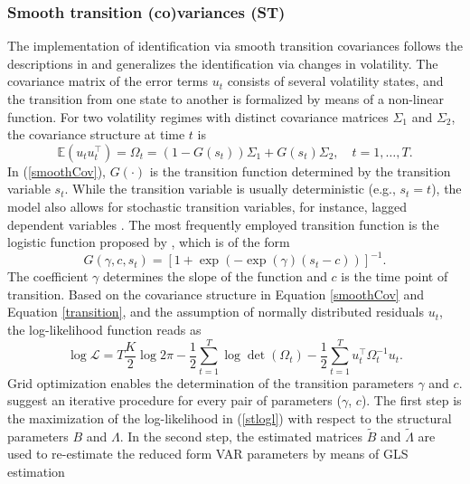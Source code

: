 \documentclass[nojss]{jss}\usepackage[]{graphicx}\usepackage[]{color}
\begin{document}
\subsubsection{Smooth transition (co)variances (ST)}\label{sec:smoothtransition}
The implementation of identification via smooth transition covariances follows the descriptions in \cite{LUTKEPOHL201743} and generalizes the identification via changes in volatility. The covariance matrix of the error terms $u_t$ consists of several volatility states, and the transition from one state to another is formalized by means of a non-linear function. For two volatility regimes with distinct covariance matrices $\Sigma_1$ and $\Sigma_2$, the covariance structure at time $t$ is
\begin{equation}\label{smoothCov}
\mathbb{E}(u_tu_t^\top) = \Omega_t = \left(1 - G(s_t)\right)\Sigma_1 + G(s_t)\Sigma_2,\quad t=1,\ldots,T.
\end{equation}
In (\ref{smoothCov}), $G(\cdot)$ is the transition function determined by the transition variable $s_t$. While the transition variable is usually deterministic (e.g., $s_t = t$), the model also allows for stochastic transition variables, for instance, lagged dependent variables \citep[see][for more details]{LUTKEPOHL201743}. The most frequently employed transition function is the logistic function proposed by \cite{Maddala1977}, which is of the form
\begin{equation}\label{transition}
G(\gamma, c, s_t) = \left[1 + \exp(- \exp(\gamma)(s_t - c))\right]^{-1}.
\end{equation}
 The coefficient $\gamma$ determines the slope of the function and $c$ is the time point of transition. Based on the covariance structure  in Equation \ref{smoothCov} and Equation \ref{transition}, and the assumption of normally distributed residuals $u_t$, the log-likelihood function reads as
\begin{equation}\label{stlogl}
\log \mathcal{L} = T\frac{K}{2}\log 2\pi - \frac{1}{2}\sum^T_{t=1}\log \det(\Omega_t) - \frac{1}{2}\sum^T_{t=1}u_t^\top\Omega_t^{-1}u_t.
\end{equation}
Grid optimization enables the determination of the transition parameters $\gamma$ and $c$. \cite{LUTKEPOHL201743} suggest an iterative procedure for every pair of parameters ($\gamma$, $c$). The first step is the maximization of the log-likelihood in (\ref{stlogl}) with respect to the structural parameters $B$ and $\Lambda$. In the second step, the estimated matrices $\widetilde{B}$ and $\widetilde{\Lambda}$ are used to re-estimate the reduced form VAR parameters by means of GLS estimation
\end{document}
